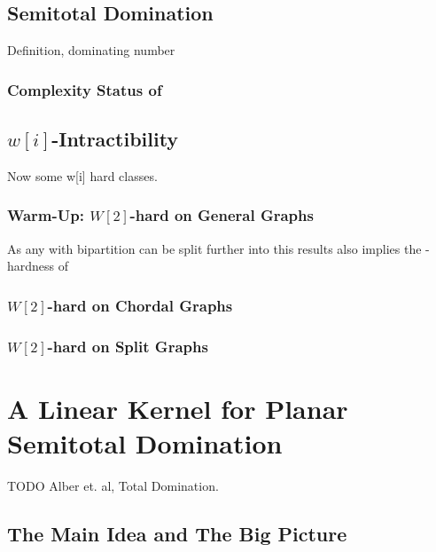 \section{Semitotal Domination}

\sdom

Definition, dominating number

\subsection*{Complexity Status of \sdom}

\section{\hmath $w[i]$-Intractibility}

Now some  w[i] hard classes. 

\subsection{Warm-Up: \hmath $W[2]$-hard on General Graphs}


As any \bg with bipartition can be split further into \rpg this results also implies the \wone-hardness of \rpg



\subsection{\hmath $W[2]$-hard on Chordal Graphs}

\subsection{\hmath $W[2]$-hard on Split Graphs}

\chapter{A Linear Kernel for Planar Semitotal Domination}

TODO Alber et. al, Total Domination. 

\section{The Main Idea and The Big Picture}



